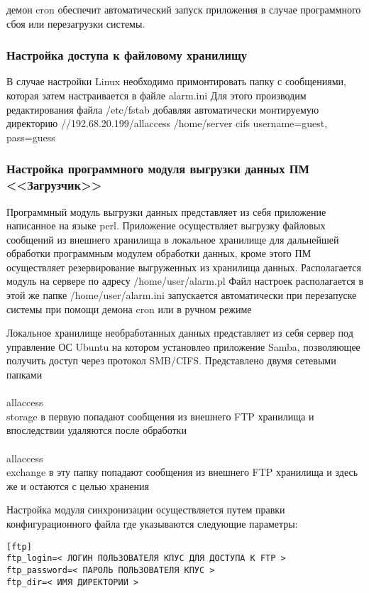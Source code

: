 ﻿\documentclass[12pt]{article}[a4paper,14pt,russian]
\begin{document}
	демон cron обеспечит автоматический запуск приложения в случае программного сбоя или перезагрузки системы.


	\subsubsection{Настройка доступа к файловому хранилищу}
	В случае настройки Linux необходимо примонтировать папку с сообщениями, которая затем настраивается в файле alarm.ini
	Для этого производим редактирования файла /etc/fstab добавляя автоматически монтируемую директорию
	//192.68.20.199/allaccess /home/server cifs username=guest, pass=guess
	\subsubsection{Настройка программного модуля выгрузки данных ПМ <<Загрузчик>>}
	Программный модуль выгрузки данных представляет из себя приложение написанное на языке perl. Приложение осуществляет выгрузку файловых сообщений из внешнего хранилища в локальное хранилище для дальнейшей обработки программным модулем обработки данных, кроме этого ПМ осуществляет резервирование выгруженных из хранилища данных.
	Располагается модуль на сервере по адресу
	/home/user/alarm.pl
	Файл настроек располагается в этой же папке 
	/home/user/alarm.ini
	запускается автоматически при перезапуске системы при помощи демона cron или в ручном режиме
	 \newline
    \newline
  

	Локальное хранилище необработанных данных представляет из себя сервер под управление ОС Ubuntu на котором установлео приложение Samba, позволяющее  получить доступ через протокол SMB/CIFS. Представлено двумя сетевыми папками
	\\<ip адрес сервера>\\allaccess\\storage
	в первую попадают сообщения из внешнего FTP хранилища и впоследствии удаляются после обработки
	\\<ip адрес сервера>\\allaccess\\exchange
	в эту папку попадают сообщения из внешнего FTP хранилища и здесь же и остаются
	с целью хранения
 
Настройка модуля синхронизации осуществляется путем правки конфигурационного файла где указываются следующие параметры:
\begin{verbatim}
[ftp]
ftp_login=< ЛОГИН ПОЛЬЗОВАТЕЛЯ КПУС ДЛЯ ДОСТУПА К FTP >
ftp_password=< ПАРОЛЬ ПОЛЬЗОВАТЕЛЯ КПУС >
ftp_dir=< ИМЯ ДИРЕКТОРИИ >
\end{verbatim}
\end{document}
